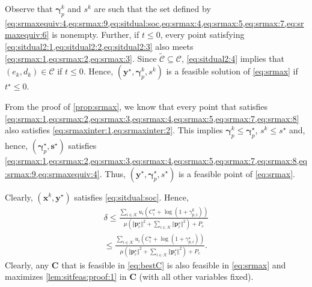 \documentclass[a4paper,10pt,journal]{IEEEtran}
\let\vec\bm
\begin{document}
\begin{IEEEproof}
	Observe that $\vec\gamma_p^k$ and $s^k$ are such that the set defined by \cref{eq:srmaxequiv:4,eq:srmax:9,eq:sitdual:soc,eq:srmax:4,eq:srmax:5,eq:srmax:7,eq:srmaxequiv:6} is nonempty. Further, if $t \le 0$, every point satisfying \cref{eq:sitdual2:1,eq:sitdual2:2,eq:sitdual2:3} also meets \cref{eq:srmax:1,eq:srmax:2,eq:srmax:3}. Since $\tilde{\mathcal C} \subseteq \mathcal C$, \cref{eq:sitdual2:4} implies that $(e_k, d_k)\in\mathcal C$ if $t \le 0$. Hence, $(\vec y^\star, \vec \gamma_p^k, s^k)$ is a feasible solution of \cref{eq:srmax} if $t^\star \le 0$.

	From the proof of \cref{prop:srmax}, we know that every point that satisfies \cref{eq:srmax:1,eq:srmax:2,eq:srmax:3,eq:srmax:4,eq:srmax:5,eq:srmax:7,eq:srmax:8} also satisfies \cref{eq:srmaxinter:1,eq:srmaxinter:2}.
	This implies $\vec\gamma_p^k \le \vec\gamma_p^\star$, $s^k \le s^\star$ and, hence, $(\vec\gamma_p^\star, \vec s^\star)$ satisfies \cref{eq:srmax:1,eq:srmax:2,eq:srmax:3,eq:srmax:4,eq:srmax:5,eq:srmax:7,eq:srmax:8,eq:srmax:9,eq:srmaxequiv:4}. Thus, $(\vec y^\star, \vec \gamma_p^\star, s^\star)$ is a feasible point of \cref{eq:srmax}.

	Clearly, $(\vec x^k, \vec y^\star)$ satisfies \cref{eq:sitdual:soc}. Hence,
	\begin{multline}
	\delta
		\le \frac{\sum_{i\in\mathcal K} u_i ( C_i^\star + \log( 1 + \gamma_{p,i}^k) )}{{\mu \left( \Vert \vec p_c^\star \Vert^2 + \sum_{i\in\mathcal K} \Vert \vec p_i^\star \Vert^2 \right) + P_c}} \\
		\le \frac{\sum_{i\in\mathcal K} u_i ( C_i^\star + \log( 1 + \gamma_{p,i}^\star) )}{{\mu \left( \Vert \vec p_c^\star \Vert^2 + \sum_{i\in\mathcal K} \Vert \vec p_i^\star \Vert^2 \right) + P_c}}. \label{lem:sitfeas:proof:1}
	\end{multline}
	Clearly, any $\vec C$ that is feasible in \cref{eq:bestC} is also feasible in \cref{eq:srmax} and maximizes \cref{lem:sitfeas:proof:1} in $\vec C$ (with all other variables fixed).
\end{IEEEproof}
\end{document}
